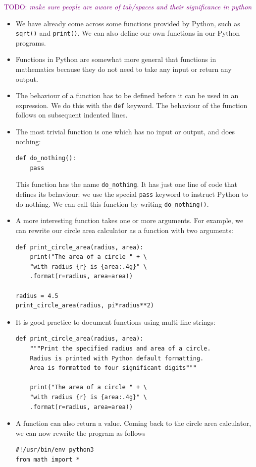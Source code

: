 \documentclass[a4paper,twoside]{memoir}
\newcommand{\shellcmd}{\texttt}
\newcommand{\TODO}[1]{\textcolor{purple}{TODO: \emph{#1}}}
\begin{document}
\TODO{make sure people are aware of tab/spaces and their significance in python}

\begin{itemize}
	\item We have already come across some functions provided by Python, such as \shellcmd{sqrt()} and \shellcmd{print()}.  We can also define our own functions in our Python programs.
	\item Functions in Python are somewhat more general that functions in mathematics because they do not need to take any input or return any output.
	\item The behaviour of a function has to be defined before it can be used in an expression.  We do this with the \shellcmd{def} keyword.  The behaviour of the function follows on subsequent indented lines.
	\item The most trivial function is one which has no input or output, and does nothing:
\begin{verbatim}
def do_nothing():
	pass
\end{verbatim}
This function has the name \shellcmd{do\_nothing}.  It has just one line of code that defines its behaviour: we use the special \shellcmd{pass} keyword to instruct Python to do nothing.  We can call this function by writing \shellcmd{do\_nothing()}.
	\item A more interesting function takes one or more arguments.  For example, we can rewrite our circle area calculator as a function with two arguments:
\begin{verbatim}
def print_circle_area(radius, area):
	print("The area of a circle " + \
	"with radius {r} is {area:.4g}" \
	.format(r=radius, area=area))

radius = 4.5
print_circle_area(radius, pi*radius**2)
\end{verbatim}
\item It is good practice to document functions using multi-line strings:
\begin{verbatim}
def print_circle_area(radius, area):
	"""Print the specified radius and area of a circle.
	Radius is printed with Python default formatting.
	Area is formatted to four significant digits"""

	print("The area of a circle " + \
	"with radius {r} is {area:.4g}" \
	.format(r=radius, area=area))
\end{verbatim}

\item A function can also return a value.  Coming back to the circle area calculator, we can now rewrite the program as follows
\begin{verbatim}
#!/usr/bin/env python3
from math import *


\end{verbatim}
\end{itemize}
\end{document}
